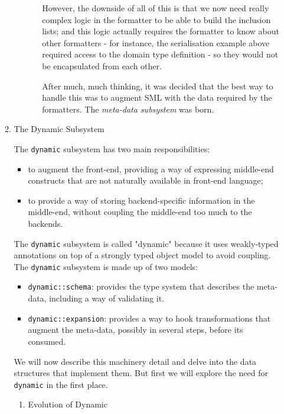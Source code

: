 \documentclass[11pt]{article}
\begin{document}
\begin{enumerate}
\begin{enumerate}
\begin{enumerate}
\begin{enumerate}
However, the downside of all of this is that we now need really
complex logic in the formatter to be able to build the inclusion
lists; and this logic actually requires the formatter to know about
other formatters - for instance, the serialisation example above
required access to the domain type definition - so they would not be
encapsulated from each other.

After much, much thinking, it was decided that the best way to handle
this was to augment SML with the data required by the formatters. The
\emph{meta-data subsystem} was born.
\end{enumerate}
\end{enumerate}

\item The Dynamic Subsystem
\label{sec-2-2-1-2-4}

The \texttt{dynamic} subsystem has two main responsibilities:

\begin{itemize}
\item to augment the front-end, providing a way of expressing middle-end
constructs that are not naturally available in front-end language;
\item to provide a way of storing backend-specific information in the
middle-end, without coupling the middle-end too much to the
backends.
\end{itemize}

The \texttt{dynamic} subsystem is called "dynamic" because it uses
weakly-typed annotations on top of a strongly typed object model to
avoid coupling. The \texttt{dynamic} subsystem is made up of two models:

\begin{itemize}
\item \texttt{dynamic::schema}: provides the type system that describes the
meta-data, including a way of validating it.
\item \texttt{dynamic::expansion}: provides a way to hook transformations that
augment the meta-data, possibly in several steps, before its
consumed.
\end{itemize}

We will now describe this machinery detail and delve into the data
structures that implement them. But first we will explore the need for
\texttt{dynamic} in the first place.

\begin{enumerate}
\item Evolution of Dynamic
\label{sec-2-2-1-2-4-1}


\end{enumerate}
\end{enumerate}
\end{enumerate}
\end{document}
